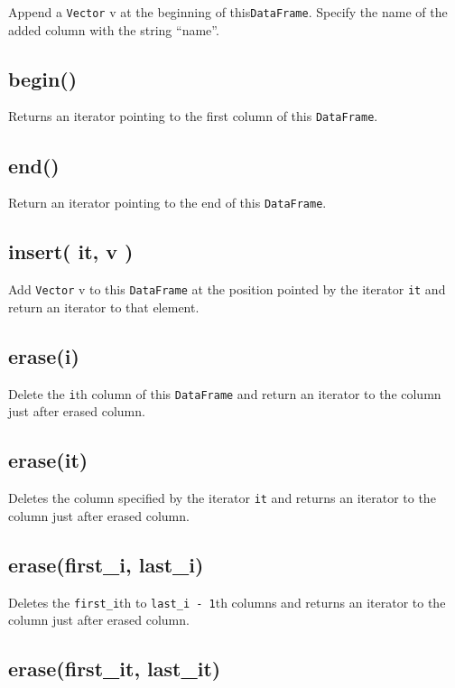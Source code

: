 \documentclass[]{book}
\theoremstyle{definition}
\theoremstyle{definition}
\theoremstyle{remark}
\begin{document}
Append a \texttt{Vector} v at the beginning of this\texttt{DataFrame}.
Specify the name of the added column with the string ``name''.

\subsection{begin()}\label{begin-1}

Returns an iterator pointing to the first column of this
\texttt{DataFrame}.

\subsection{end()}\label{end-1}

Return an iterator pointing to the end of this \texttt{DataFrame}.

\subsection{insert( it, v )}\label{insert-it-v}

Add \texttt{Vector} v to this \texttt{DataFrame} at the position pointed
by the iterator \texttt{it} and return an iterator to that element.

\subsection{erase(i)}\label{erasei-1}

Delete the \texttt{i}th column of this \texttt{DataFrame} and return an
iterator to the column just after erased column.

\subsection{erase(it)}\label{eraseit-1}

Deletes the column specified by the iterator \texttt{it} and returns an
iterator to the column just after erased column.

\subsection{erase(first\_i, last\_i)}\label{erasefirst_i-last_i}

Deletes the \texttt{first\_i}th to \texttt{last\_i\ -\ 1}th columns and
returns an iterator to the column just after erased column.

\subsection{erase(first\_it, last\_it)}\label{erasefirst_it-last_it}
\end{document}
